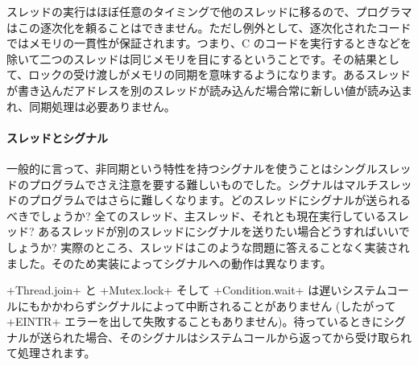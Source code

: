 スレッドの実行はほぼ任意のタイミングで他のスレッドに移るので、プログラマはこの逐次化を頼ることはできません。ただし例外として、逐次化されたコードではメモリの一貫性が保証されます。つまり、C のコードを実行するときなどを除いて二つのスレッドは同じメモリを目にするということです。その結果として、ロックの受け渡しがメモリの同期を意味するようになります。あるスレッドが書き込んだアドレスを別のスレッドが読み込んだ場合常に新しい値が読み込まれ、同期処理は必要ありません。

\paragraph {スレッドとシグナル}

一般的に言って、非同期という特性を持つシグナルを使うことはシングルスレッドのプログラムでさえ注意を要する難しいものでした。シグナルはマルチスレッドのプログラムではさらに難しくなります。どのスレッドにシグナルが送られるべきでしょうか? 全てのスレッド、主スレッド、それとも現在実行しているスレッド? あるスレッドが別のスレッドにシグナルを送りたい場合どうすればいいでしょうか? 実際のところ、スレッドはこのような問題に答えることなく実装されました。そのため実装によってシグナルへの動作は異なります。

\ml+Thread.join+ と \ml+Mutex.lock+ そして \ml+Condition.wait+ は遅いシステムコールにもかかわらずシグナルによって中断されることがありません (したがって \ml+EINTR+ エラーを出して失敗することもありません)。待っているときにシグナルが送られた場合、そのシグナルはシステムコールから返ってから受け取られて処理されます。

